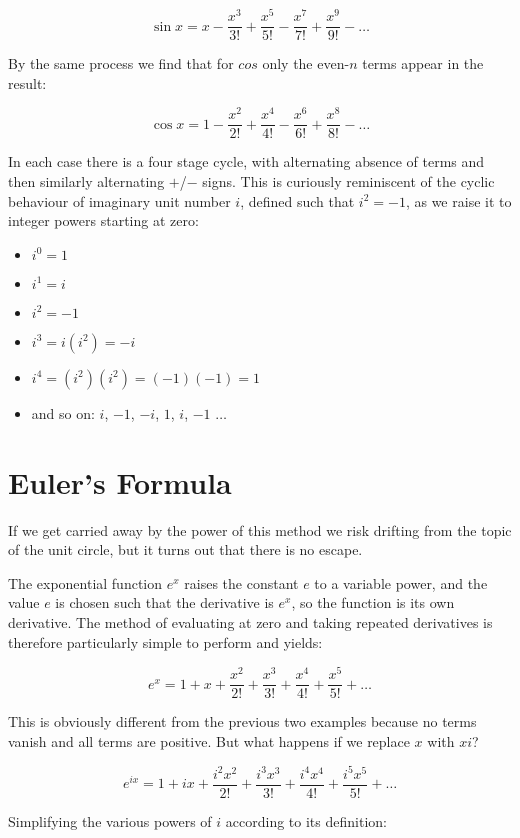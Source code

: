 $$
\sin x = x - \frac{x^3}{3!} + \frac{x^5}{5!} - \frac{x^7}{7!} + \frac{x^9}{9!} - \ldots
$$

By the same process we find that for $cos$ only the even-$n$ terms appear in the result:

$$
\cos x = 1 - \frac{x^2}{2!} + \frac{x^4}{4!} - \frac{x^6}{6!} + \frac{x^8}{8!} - \ldots
$$

In each case there is a four stage cycle, with alternating absence of terms and then similarly alternating $+$/$-$ signs. This is curiously reminiscent of the cyclic behaviour of imaginary unit number $i$, defined such that $i^2 = -1$, as we raise it to integer powers starting at zero:

\begin{itemize}
    \item $i^0 = 1$
    \item $i^1 = i$
    \item $i^2 = -1$
    \item $i^3 = i(i^2) = -i$
    \item $i^4 = (i^2)(i^2) = (-1)(-1) = 1$
    \item and so on: $i$, $-1$, $-i$, $1$, $i$, $-1$ $\ldots$
\end{itemize}

\section{Euler's Formula}

If we get carried away by the power of this method we risk drifting from the topic of the unit circle, but it turns out that there is no escape.

The exponential function $e^x$ raises the constant $e$ to a variable power, and the value $e$ is chosen such that the derivative is $e^x$, so the function is its own derivative. The method of evaluating at zero and taking repeated derivatives is therefore particularly simple to perform and yields:

$$
e^x = 1 + x + \frac{x^2}{2!} + \frac{x^3}{3!} + \frac{x^4}{4!} + \frac{x^5}{5!} + \ldots
$$

This is obviously different from the previous two examples because no terms vanish and all terms are positive. But what happens if we replace $x$ with $xi$?

$$
e^{ix} = 1 + ix + \frac{i^2x^2}{2!} + \frac{i^3x^3}{3!} + \frac{i^4x^4}{4!} + \frac{i^5x^5}{5!} + \ldots
$$

Simplifying the various powers of $i$ according to its definition:

